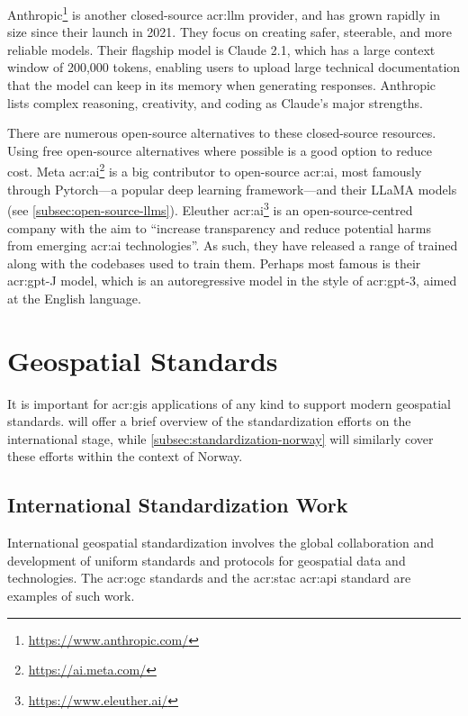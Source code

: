 Anthropic\footnote{\url{https://www.anthropic.com/}} is another closed-source \acrshort{acr:llm} provider, and has grown rapidly in size since their launch in 2021. They focus on creating safer, steerable, and more reliable models. Their flagship model is Claude 2.1, which has a large context window of 200,000 tokens, enabling users to upload large technical documentation that the model can keep in its memory when generating responses. Anthropic lists complex reasoning, creativity, and coding as Claude's major strengths.

There are numerous open-source alternatives to these closed-source resources. Using free open-source alternatives where possible is a good option to reduce cost. Meta \acrshort{acr:ai}\footnote{\url{https://ai.meta.com/}} is a big contributor to open-source \acrshort{acr:ai}, most famously through Pytorch---a popular deep learning framework---and their LLaMA models (see \autoref{subsec:open-source-llms}). Eleuther \acrshort{acr:ai}\footnote{\url{https://www.eleuther.ai/}} is an open-source-centred company with the aim to \enquote{increase transparency and reduce potential harms from emerging \acrshort{acr:ai} technologies}. As such, they have released a range of trained  along with the codebases used to train them. Perhaps most famous is their \acrshort{acr:gpt}-J model, which is an autoregressive model in the style of \acrshort{acr:gpt}-3, aimed at the English language.

\section{Geospatial Standards}\label{sec:geospatial-standards}

It is important for \acrshort{acr:gis} applications of any kind to support modern geospatial standards.  will offer a brief overview of the standardization efforts on the international stage, while \autoref{subsec:standardization-norway} will similarly cover these efforts within the context of Norway.

\subsection{International Standardization Work}\label{subsec:standardization-international}

International geospatial standardization involves the global collaboration and development of uniform standards and protocols for geospatial data and technologies. The \acrshort{acr:ogc} standards and the \acrshort{acr:stac} \acrshort{acr:api} standard are examples of such work.

